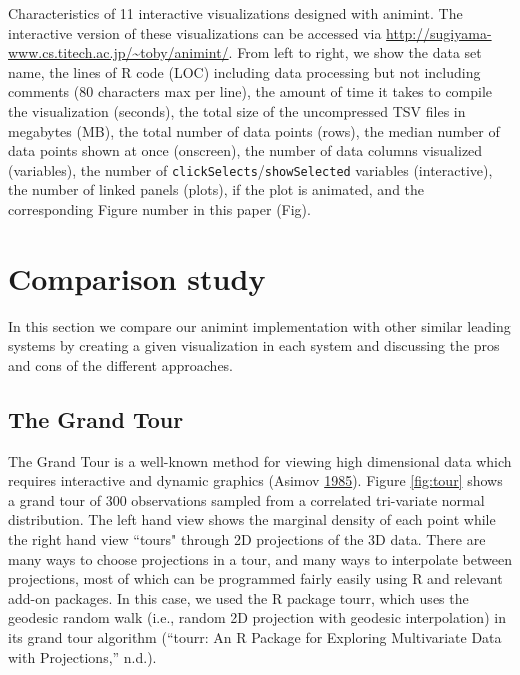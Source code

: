 \documentclass[12pt,]{isuthesis}
\begin{document}
\begin{table}[htp] %
  \centering
  \caption{Characteristics of 11 interactive visualizations designed with
    animint. The interactive version of these visualizations can be accessed 
    via \url{http://sugiyama-www.cs.titech.ac.jp/\~toby/animint/}.
    From left to right, we show the data set name, the
    lines of R code (LOC) including data processing but not including comments
    (80 characters max per line),
    the amount of time it takes to compile the visualization (seconds),
    the total size of the uncompressed TSV files in megabytes (MB),
    the total number of data points (rows),
    the median number of data points shown at once (onscreen),
    the number of data columns visualized (variables),
    the number of \texttt{clickSelects}/\texttt{showSelected} 
    variables (interactive),
    the number of linked panels (plots),
    if the plot is animated,
    and the corresponding Figure number in this paper (Fig).
  }
  \hspace*{-2cm}
  
\label{tab:examples}
\end{table}

\section{Comparison study}
\label{sec:compare}

In this section we compare our animint implementation with other similar
leading systems by creating a given visualization in each system and
discussing the pros and cons of the different approaches.

\subsection{The Grand Tour}
\label{sec:tour}

The Grand Tour is a well-known method for viewing high dimensional data
which requires interactive and dynamic graphics (Asimov
\protect\hyperlink{ref-grand-tour}{1985}). Figure \ref{fig:tour} shows a
grand tour of 300 observations sampled from a correlated tri-variate
normal distribution. The left hand view shows the marginal density of
each point while the right hand view ``tours" through 2D projections of
the 3D data. There are many ways to choose projections in a tour, and
many ways to interpolate between projections, most of which can be
programmed fairly easily using R and relevant add-on packages. In this
case, we used the R package tourr, which uses the geodesic random walk
(i.e., random 2D projection with geodesic interpolation) in its grand
tour algorithm (``tourr: An R Package for Exploring Multivariate Data
with Projections,'' n.d.).
\end{document}
